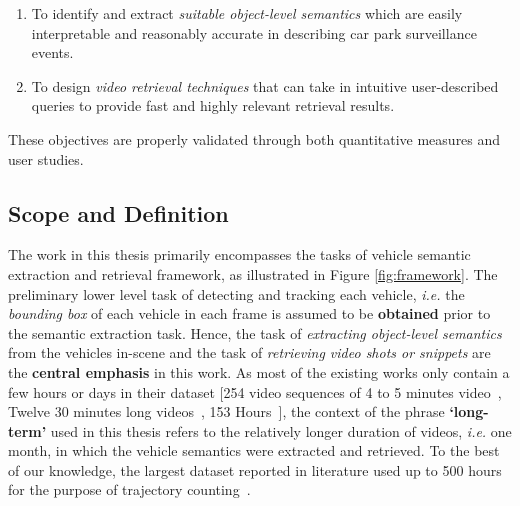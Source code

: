 \begin{enumerate}[start=1,label={(\bfseries O\arabic*):}]
  \item To identify and extract \textit{suitable object-level semantics} which are easily interpretable and reasonably accurate in describing car park surveillance events.
  \item To design \textit{video retrieval techniques} that can take in intuitive user-described queries to provide fast and highly relevant retrieval results.
\end{enumerate}
\noindent These objectives are properly validated through both quantitative measures and user studies.  

\vspace{1em}
\subsection{Scope and Definition}
\label{subsec:scope}
The work in this thesis primarily encompasses the tasks 
of vehicle semantic extraction and retrieval framework, as illustrated in Figure \ref{fig:framework}. The preliminary lower level task of detecting and tracking each vehicle, \emph{i.e.} the \textit{bounding box} of each vehicle in each frame is assumed to be \textbf{obtained} prior to the semantic extraction task.
Hence, the task of \textit{extracting object-level semantics} from the vehicles in-scene and the task of \textit{retrieving video shots or snippets} are the \textbf{central emphasis} in this work.
As most of the existing works only contain a few hours or days in their dataset [254 video sequences of 4 to 5 minutes video~\cite{liu2016highway}, Twelve 30 minutes long videos~\cite{marmol2016quickspot}, 153 Hours~\cite{ren2018learning}], the context of the phrase \textbf{`long-term'} used in this thesis refers to the relatively longer duration of videos, \emph{i.e.} one month, in which the vehicle semantics were extracted and retrieved. To the best of our knowledge, the largest dataset reported in literature used up to 500 hours for the purpose of trajectory counting~\cite{lessard2016countingapp}.


